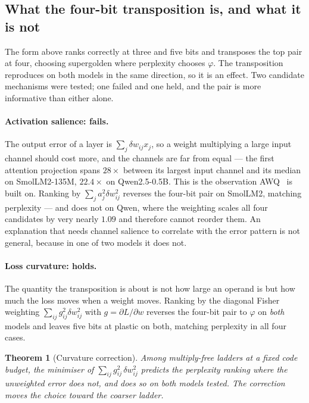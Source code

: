 \documentclass[11pt]{article}
\newtheorem{theorem}{Theorem}
\theoremstyle{definition}
\begin{document}
\subsection{What the four-bit transposition is, and what it is not}
\label{sec:salience}

The form above ranks correctly at three and five bits and transposes the top
pair at four, choosing supergolden where perplexity chooses $\varphi$. The
transposition reproduces on both models in the same direction, so it is an
effect. Two candidate mechanisms were tested; one failed and one held, and the
pair is more informative than either alone.

\paragraph{Activation salience: fails.} The output error of a layer is
$\sum_j \delta w_{ij}x_j$, so a weight multiplying a large input channel should
cost more, and the channels are far from equal --- the first attention
projection spans $28\times$ between its largest input channel and its median on
SmolLM2-135M, $22.4\times$ on Qwen2.5-0.5B. This is the observation
AWQ~\cite{awq} is built on. Ranking by $\sum_j a_j^{2}\delta w_{ij}^{2}$
reverses the four-bit pair on SmolLM2, matching perplexity --- and does not on
Qwen, where the weighting scales all four candidates by very nearly $1.09$ and
therefore cannot reorder them. An explanation that needs channel salience to
correlate with the error pattern is not general, because in one of two models it
does not.

\paragraph{Loss curvature: holds.} The quantity the transposition is about is
not how large an operand is but how much the loss moves when a weight moves.
Ranking by the diagonal Fisher weighting $\sum_{ij} g_{ij}^{2}\delta w_{ij}^{2}$
with $g=\partial L/\partial w$ reverses the four-bit pair to $\varphi$ on
\emph{both} models and leaves five bits at plastic on both, matching perplexity
in all four cases.

\begin{theorem}[Curvature correction]\label{thm:curvature}
Among multiply-free ladders at a fixed code budget, the minimiser of
$\sum_{ij} g_{ij}^{2}\,\delta w_{ij}^{2}$ predicts the perplexity ranking where
the unweighted error does not, and does so on both models tested. The correction
moves the choice toward the coarser ladder.
\end{theorem}
\end{document}
